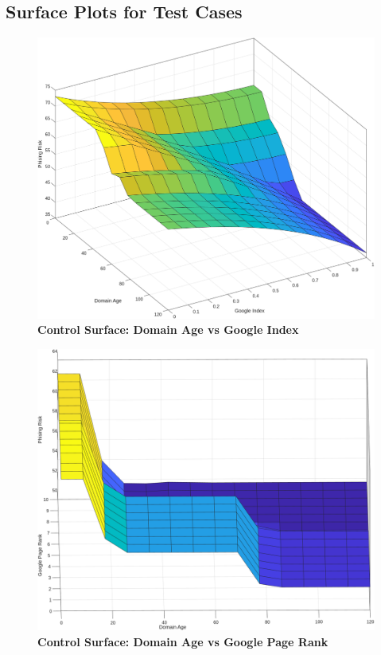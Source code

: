 \documentclass[11pt]{article}
\begin{document}
\newpage
\printbibliography

\newpage
\begin{appendices}
\section{Surface Plots for Test Cases}
\label{surfaceplots}

\begin{figure}[H]
    \centering
    \begin{minipage}{0.45\textwidth}
        \includegraphics[width=\textwidth]{surface_plots/domain_age_google_index.png}
        \centering
        \textbf{Control Surface: Domain Age vs Google Index}
    \end{minipage}
    \hfill
    \begin{minipage}{0.45\textwidth}
        \includegraphics[width=\textwidth]{surface_plots/domain_age_google_page_rank.png}
        \centering
        \textbf{Control Surface: Domain Age vs Google Page Rank}
    \end{minipage}
    \vspace{0.5cm}
    

\end{figure}
\end{appendices}
\end{document}
